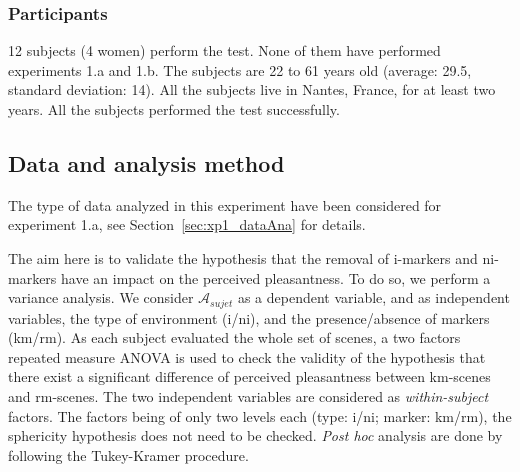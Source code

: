 \documentclass[twoside,twocolumn]{article}
\begin{document}
\subsubsection*{Participants}


12 subjects (4 women) perform the test. None of them have performed experiments 1.a and 1.b. The subjects are 22 to 61 years old (average: 29.5, standard deviation: 14). All the subjects live in Nantes, France, for at least two years. All the subjects performed the test successfully.

\subsection{Data and analysis method}


The type of data analyzed in this experiment have been considered for experiment 1.a, see Section~\ref{sec:xp1_dataAna} for details.


The aim here is to validate the hypothesis that the removal of i-markers and ni-markers have an impact on the perceived pleasantness. To do so, we perform a variance analysis. We consider $\mathcal{A}_{sujet}$ as a dependent variable, and as independent variables, the type of environment (i/ni), and the presence/absence of markers (km/rm). As each subject evaluated the whole set of scenes, a two factors repeated measure ANOVA is used to check the validity of the hypothesis that there exist a significant difference of perceived pleasantness between km-scenes and rm-scenes. The two independent variables are considered as \emph{within-subject} factors. The factors being of only two levels each (type: i/ni; marker: km/rm), the sphericity hypothesis does not need to be checked. \emph{Post hoc} analysis are done by following the Tukey-Kramer procedure.
\end{document}
